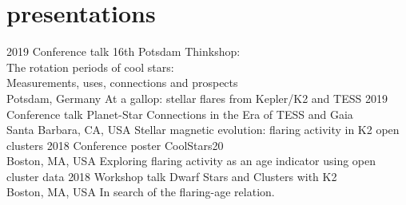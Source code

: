 \documentclass[]{k-cv} %
\begin{document}
\section{presentations}

\begin{entrylist}
\entry
{2019}
{Conference talk}
{16th Potsdam Thinkshop: \vspace{-.1cm}\\\null\hfill
The rotation periods of cool stars:\vspace{-.1cm}\\\null\hfill Measurements, uses, connections and prospects \vspace{-.1cm}\\\null\hfill
Potsdam, Germany}
{At a gallop: stellar flares from Kepler/K2 and TESS}
\entry
{2019}
{Conference talk}
{Planet-Star Connections in the Era of TESS and Gaia\vspace{-.1cm}\\\null\hfill Santa Barbara, CA, USA}
{Stellar magnetic evolution: flaring activity in K2 open clusters}
\entry
{2018}
{Conference poster}
{CoolStars20\vspace{-.1cm}\\\null\hfill Boston, MA, USA}
{Exploring flaring activity as an age indicator using open cluster data}
\entry
{2018}
{Workshop talk}
{Dwarf Stars and Clusters with K2\vspace{-.1cm}\\\null\hfill Boston, MA, USA}
{In search of the flaring-age relation.}
\end{entrylist}


%
\end{document}
